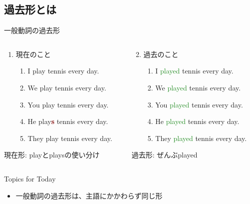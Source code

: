 \documentclass[aspectratio=169,xcolor={dvipsnames,table}]{beamer}
\newcommand{\myaudio}[1]{\href{#1}{\faVolumeUp}}
\begin{document}
\subsection{過去形とは}
\begin{frame}[plain]{一般動詞の過去形}
 \Large

\begin{columns}
\begin{column}{.48\textwidth}
\begin{enumerate}
 \item 現在のこと
       \begin{enumerate}
	\item I play tennis every day.
	\item We play tennis every day.
	\item You play tennis every day.
	\item He play\textcolor{Maroon}{\bfseries s} tennis every day.
	\item They play tennis every day.
       \end{enumerate}
\end{enumerate}

{\small 現在形: playとplaysの使い分け}
\end{column}
\begin{column}{.48\textwidth}
\begin{enumerate}
\setcounter{enumi}{1} \item 過去のこと
        \begin{enumerate}
	\item I \textcolor{ForestGreen}{played} tennis every day.
	\item We \textcolor{ForestGreen}{played} tennis every day.
	\item You \textcolor{ForestGreen}{played} tennis every day.
	\item He \textcolor{ForestGreen}{played} tennis every day.
	\item They \textcolor{ForestGreen}{played} tennis every day.
       \end{enumerate}
\end{enumerate}

{\small 過去形: ぜんぶplayed}
\end{column}
\end{columns}

\begin{exampleblock}{Topics for Today}\small
\begin{itemize}
 \item 一般動詞の過去形は、主語にかかわらず同じ形
\end{itemize}
\end{exampleblock}

\hfill\myaudio{./audio/025_past_do_01.mp3}
\end{frame}
\end{document}
